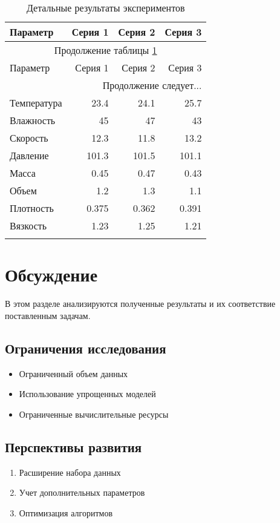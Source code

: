 \documentclass[a4paper,12pt]{article}
\begin{document}
\begin{longtable}{lrrr}
\caption{Детальные результаты экспериментов} \\
\toprule
Параметр & Серия 1 & Серия 2 & Серия 3 \\
\midrule
\endfirsthead
\multicolumn{4}{c}{Продолжение таблицы \ref{tab:long}} \\
\toprule
Параметр & Серия 1 & Серия 2 & Серия 3 \\
\midrule
\endhead
\bottomrule
\multicolumn{4}{r}{Продолжение следует...} \\
\endfoot
\bottomrule
\endlastfoot
Температура & 23.4 & 24.1 & 25.7 \\
Влажность & 45 & 47 & 43 \\
Скорость & 12.3 & 11.8 & 13.2 \\
Давление & 101.3 & 101.5 & 101.1 \\
Масса & 0.45 & 0.47 & 0.43 \\
Объем & 1.2 & 1.3 & 1.1 \\
Плотность & 0.375 & 0.362 & 0.391 \\
Вязкость & 1.23 & 1.25 & 1.21 \\
\label{tab:long}
\end{longtable}

\section{Обсуждение}
\label{sec:discussion}

В этом разделе анализируются полученные результаты и их соответствие поставленным задачам.

\subsection{Ограничения исследования}
\begin{itemize}
\item Ограниченный объем данных
\item Использование упрощенных моделей
\item Ограниченные вычислительные ресурсы
\end{itemize}

\subsection{Перспективы развития}
\begin{enumerate}
\item Расширение набора данных
\item Учет дополнительных параметров
\item Оптимизация алгоритмов
\end{enumerate}
\end{document}
